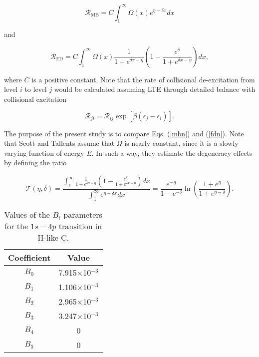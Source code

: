 \documentclass[a4paper,10pt]{article}
\begin{document}
\begin{equation}\label{mbn}
\mathcal{R}_{\mathrm{MB}}=C\int_{1}^{\infty}\Omega\left(x\right)e^{\eta-\delta x}dx
\end{equation}

\noindent and

\begin{equation}\label{fdn}
\mathcal{R}_{\mathrm{FD}}=C\int_{1}^{\infty}\Omega\left(x\right)\frac{1}{1+e^{\delta x-\eta}}\left(1-\frac{e^{\delta}}{1+e^{\delta x-\eta}}\right)dx,
\end{equation}

\noindent where $C$ is a positive constant. Note that the rate of collisional de-excitation from level $i$ to level $j$ would be calculated assuming LTE through detailed balance with collisional excitation

\begin{equation}
\mathcal{R}_{ji}=\mathcal{R}_{ij}\exp\left[\beta\left(\epsilon_j-\epsilon_i\right)\right].
\end{equation}

The purpose of the present study is to compare Eqs. (\ref{mbn}) and (\ref{fdn}). Note that Scott \cite{SCOTT16} and Tallents \cite{TALLENTS16} assume that $\Omega$ is nearly constant, since it is a slowly varying function of energy $E$. In such a way, they estimate the degeneracy effects by defining the ratio

\begin{equation*}
\mathcal{T}(\eta,\delta)=\frac{\int_{1}^{\infty}\frac{1}{1+e^{\delta x-\eta}}\left(1-\frac{e^{\delta}}{1+e^{\delta x-\eta}}\right)dx}{\int_{1}^{\infty}e^{\eta-\delta x}dx}=\frac{e^{-\eta}}{1-e^{-\delta}}\ln\left(\frac{1+e^{\eta}}{1+e^{\eta-\delta}}\right).
\end{equation*}

\begin{table}[ht]
\begin{center}
\begin{tabular}{|c|c|}\hline
Coefficient & Value \\ \hline
$B_0$ & 7.915$\times$10$^ {-3}$ \\ 
$B_1$ & 1.106$\times$10$^ {-3}$ \\
$B_2$ & 2.965$\times$10$^ {-3}$ \\
$B_3$ & 3.247$\times$10$^ {-3}$ \\
$B_4$ & 0 \\
$B_5$ & 0 \\
\hline
\end{tabular}
\end{center}
\caption{Values of the $B_i$ parameters for the $1s-4p$ transition in H-like C.} \label{tab1}
\end{table}
\end{document}
